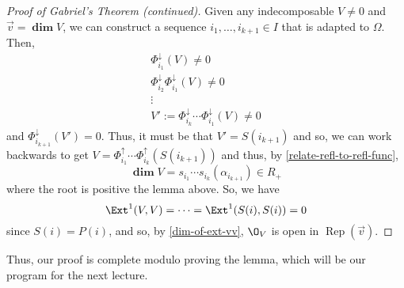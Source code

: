 \documentclass[11pt,leqno,oneside]{amsbook}
\numberwithin{thm}{section}
\newcommand{\Rep}{\operatorname{Rep}} %
\newcommand{\grdim}{\boldsymbol{\dim}} %
\newcommand{\sinktosourcefunc}{\Phi^\downarrow} %
\newcommand{\sourcetosinkfunc}{\Phi^\uparrow} %
\newcommand{\roots}{R} %
\begin{document}
\begin{proof}[Proof of Gabriel's Theorem (continued)]
  Given any indecomposable \(V \neq 0\) and \(\vec{v} = \grdim V\), we
  can construct a sequence \(i_1, \ldots, i_{k+1} \in I\) that is
  adapted to \(\Omega\). Then,
  \begin{align*}
    \sinktosourcefunc_{i_1}(V) \neq 0 \\
    \sinktosourcefunc_{i_2}\sinktosourcefunc_{i_1}(V) \neq 0 \\
    \vdots\\
    V' := \sinktosourcefunc_{i_k} \cdots \sinktosourcefunc_{i_1}(V) \neq 0
  \end{align*}
  and \(\sinktosourcefunc_{i_{k+1}}(V') = 0\). Thus, it must be that
  \(V' = S(i_{k+1})\) and so, we can work backwards to get \(V =
  \sourcetosinkfunc_{i_1} \cdots \sourcetosinkfunc_{i_k}(S(i_{k+1}))\)
  and thus, by \ref{relate-refl-to-refl-func}, \[
    \grdim V = s_{i_1} \cdots s_{i_k}(\alpha_{i_{k+1}}) \in \roots_+
  \]
  where the root is positive the lemma above. So, we have \[
    \Ext^1(V,V) = \cdots = \Ext^1(S(i),S(i)) = 0
  \]
  since \(S(i) = P(i)\), and so, by \ref{dim-of-ext-vv}, \(\O_V\) is open
  in \(\Rep(\vec{v})\). 
\end{proof}
Thus, our proof is complete modulo proving the lemma, which will be
our program for the next lecture.
\end{document}
